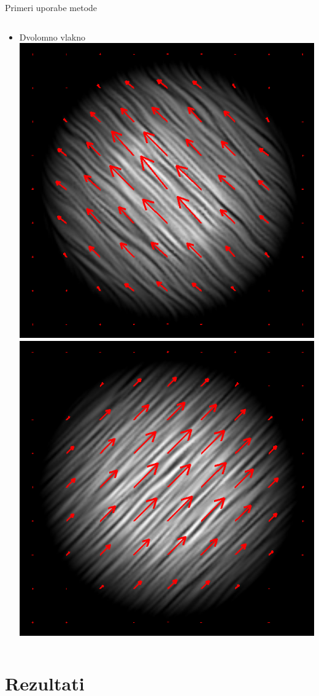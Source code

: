 \documentclass{beamer}
\begin{document}
\begin{frame}{Primeri uporabe metode}
\begin{columns}[c]
\begin{column}[T]{.5\textwidth}
\begin{itemize}
 \item Dvolomno vlakno
  \includegraphics[width=.41\textwidth]{./Slike/licp_0_68} \hspace{2pt}
  \includegraphics[width=.41\textwidth]{./Slike/licp_0_78}
\end{itemize}

\end{column}

\end{columns}

\end{frame}

\section{Rezultati}
\end{document}
